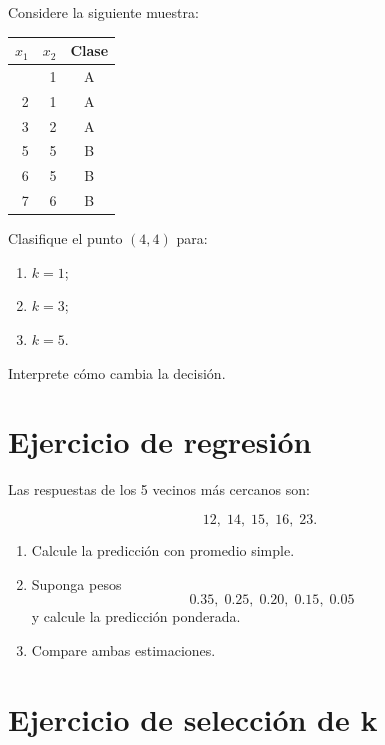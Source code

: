 \documentclass[
  spanish,
  10.5pt,
  letterpaper,
  DIV=11,
  numbers=noendperiod,
  oneside,
  open=any]{scrreprt}
\newcounter{none} %
\providecommand{\tightlist}{%
  \setlength{\itemsep}{0pt}\setlength{\parskip}{0pt}}
\theoremstyle{definition}
\theoremstyle{definition}
\theoremstyle{plain}
\theoremstyle{remark}
\begin{document}

Considere la siguiente muestra:

{\def\LTcaptype{none} %
\begin{longtable}[]{@{}rrc@{}}
\toprule\noalign{}
\(x_1\) & \(x_2\) & Clase \\
\midrule\noalign{}
\endhead
\bottomrule\noalign{}
\endlastfoot
1 & 1 & A \\
2 & 1 & A \\
3 & 2 & A \\
5 & 5 & B \\
6 & 5 & B \\
7 & 6 & B \\
\end{longtable}
}

Clasifique el punto \((4,4)\) para:

\begin{enumerate}
\def\labelenumi{\arabic{enumi}.}
\tightlist
\item
  \(k=1\);
\item
  \(k=3\);
\item
  \(k=5\).
\end{enumerate}

Interprete cómo cambia la decisión.

\section*{Ejercicio de regresión}\label{ejercicio-de-regresiuxf3n}


Las respuestas de los 5 vecinos más cercanos son:

\[
12,\;14,\;15,\;16,\;23.
\]

\begin{enumerate}
\def\labelenumi{\arabic{enumi}.}
\tightlist
\item
  Calcule la predicción con promedio simple.
\item
  Suponga pesos \[
  0.35,\;0.25,\;0.20,\;0.15,\;0.05
  \] y calcule la predicción ponderada.
\item
  Compare ambas estimaciones.
\end{enumerate}

\section*{Ejercicio de selección de
k}\label{ejercicio-de-selecciuxf3n-de-k}
\end{document}
